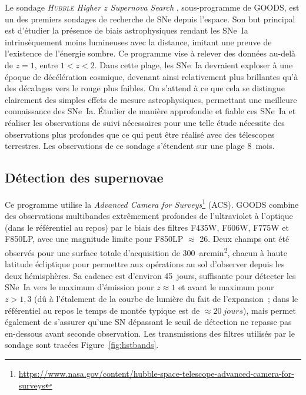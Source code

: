\documentclass[../main/main.tex]{subfiles}
\begin{document}
Le sondage \textit{\textsc{Hubble} Higher $z$ Supernova
Search} \citep[HHZSS,][]{strolger2004}, sous-programme de GOODS, est un des
premiers sondages de recherche de SNe depuis l'espace. Son but principal est
d'étudier la présence de biais astrophysiques rendant les SNe~Ia intrinsèquement
moins lumineuses avec la distance, imitant une preuve de l'existence de
l'énergie sombre. Ce programme vise à relever des données au-delà de $z = 1$,
entre $1 < z < 2$. Dans cette plage, les SNe~Ia devraient exploser à une époque
de décélération cosmique, devenant ainsi relativement plus brillantes qu'à des
décalages vers le rouge plus faibles. On s'attend à ce que cela se distingue
clairement des simples effets de mesure astrophysiques, permettant une meilleure
connaissance des SNe~Ia. Étudier de manière approfondie et fiable ces SNe~Ia et
réaliser les observations de suivi nécessaires pour une telle étude nécessite
des observations plus profondes que ce qui peut être réalisé avec des télescopes
terrestres. Les observations de ce sondage s'étendent sur une plage
\SI{8}{mois}.

\subsection{Détection des supernovae}\label{ssec:hstdetec}

Ce programme utilise la \textit{Advanced Camera for
Surveys}\footnote{\href{https://www.nasa.gov/content/hubble-space-telescope-advanced-camera-for-surveys}
{https://www.nasa.gov/content/hubble-space-telescope-advanced-camera-for-surveys}}
(ACS). GOODS combine des observations multibandes extrêmement profondes de
l'ultraviolet à l'optique (dans le référentiel au repos) par le biais des
filtres F435W, F606W, F775W et F850LP, avec une magnitude limite pour F850LP
$\approx$ 26. Deux champs ont été observés pour une
surface totale d'acquisition de \SI{300}{arcmin^2}, chacun à haute latitude
écliptique pour permettre aux opérations au sol d'observer depuis les deux
hémisphères. Sa cadence est d'environ \SI{45}{jours}, suffisante pour détecter
les SNe~Ia vers le maximum d'émission pour $z \approx 1$ et avant le maximum
pour $z > 1,3$ (dû à l'étalement de la courbe de lumière du fait de
l'expansion~; dans le référentiel au repos le temps de montée typique est de
$\approx \SI{20}{jours}$), mais permet également de s'assurer qu'une SN
dépassant le seuil de détection ne repasse pas en-dessous avant seconde
observation. Les transmissions des filtres utilisés par le sondage sont tracées
Figure~\ref{fig:hstbands}.
\end{document}
